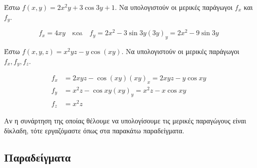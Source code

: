 \documentclass[a4paper,table]{report}
\begin{document}
\begin{example}
  Έστω $ f(x,y)=2x^{2}y+3 \cos{3y} +1 $. Να υπολογιστούν οι 
  μερικές παράγωγοι $ f_{x}$ και $ f_{y} $.
\end{example}
\begin{solution}
  \[
    f_{x}=4xy \quad \text{και} \quad f_{y}=2x^{2}-3 \sin{3y} (3y)_{y} 
    = 2x^{2}-9 \sin{3y}
  \] 
\end{solution}

\begin{example}
  Έστω $ f(x,y,z)=x^{2}yz - y \cos{(xy)} $. Να υπολογιστούν οι 
  μερικές παράγωγοι $ f_{x}, f_{y}, f_{z} $. 
\end{example}
\begin{solution}
\item {}
  \begin{align*}
    f_{x}&=2xyz- \cos{(xy)}(xy)_{x} = 2xyz-y \cos{xy} \\
    f_{y}&=x^{2}z- \cos{xy}(xy)_{y}=x^{2}z - x \cos{xy} \\
    f_{z}&=x^{2}z
  \end{align*}
\end{solution}

Αν η συνάρτηση της οποίας θέλουμε να υπολογίσουμε τις μερικές παραγώγους είναι 
δίκλαδη, τότε εργαζόμαστε όπως στα παρακάτω παραδείγματα.

\subsection*{Παραδείγματα}
\end{document}
